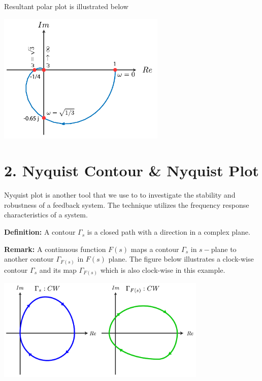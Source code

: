 \documentclass{article}
\begin{document}
Resultant polar plot is illustrated below

\vspace{6 pt}

  \begin{minipage}[h]{1\linewidth}
    \begin{center}
      \includegraphics[width=0.6\textwidth]{polar5}
    \end{center}
  \end{minipage}

\vspace{6 pt}

\section*{2. Nyquist Contour \& Nyquist Plot}

Nyquist plot is another tool that we use to to investigate 
the stability and robustness of a feedback system. The technique 
utilizes the frequency response characteristics of a system.

\textbf{Definition:} A contour $\Gamma_s$ is a closed path with a direction
in a complex plane. 

\textbf{Remark:} A continuous function $F(s)$ maps a contour
$\Gamma_s$ in $s-$plane to another contour $\Gamma_{F(s)}$
in $F(s)$ plane. The figure below illustrates a clock-wise contour 
$\Gamma_s$ and its map $\Gamma_{F(s)}$ which is also clock-wise
in this example. 

\vspace{6 pt}

  \begin{minipage}[h]{1\linewidth}
    \begin{center}
      \includegraphics[width=0.75\textwidth]{cmap}
    \end{center}
  \end{minipage}
  
\end{document}
